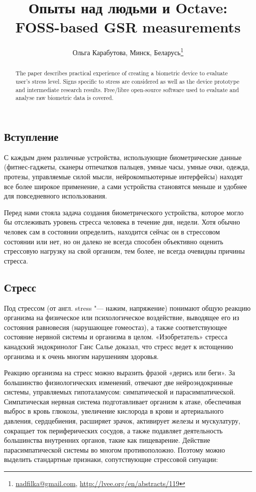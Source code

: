 \documentclass[10pt, a5paper]{article}
\begin{document}
\title{Опыты над людьми и Octave: FOSS-based GSR measurements}
\author{Ольга Карабутова, Минск, Беларусь\footnote{\url{nadfilka@gmail.com}, \url{http://lvee.org/en/abstracts/119}}}
\maketitle
\begin{abstract}
The paper describes practical experience of creating a biometric device to evaluate user’s stress level. Signs specific to stress are considered as well as the device prototype and intermediate research results. Free/libre open-source software used to evaluate and analyse raw biometric data is covered.
\end{abstract}
\subsection*{Вступление}

С каждым днем различные устройства, использующие биометрические данные (фитнес-гаджеты, сканеры отпечатков пальцев, умные часы, умные очки, одежда, протезы, управляемые силой мысли, нейрокомпьютерные интерфейсы) находят все более широкое применение, а сами устройства становятся меньше и удобнее для повседневного использования.

Перед нами стояла задача  создания биометрического устройства, которое могло бы отслеживать уровень стресса  человека в течение дня, недели.  Хотя обычно человек сам в состоянии определить, находится сейчас он в стрессовом состоянии или нет, но он далеко не всегда способен объективно оценить стрессовую  нагрузку на свой организм, тем более, не всегда очевидны причины стресса.

\subsection*{Стресс}

Под стрессом (от англ. stress "--- нажим, напряжение) понимают общую реакцию организма на физическое или психологическое воздействие, выводящее его из состояния равновесия (нарушающее гомеостаз), а также соответствующее состояние нервной системы и организма в целом.
«Изобретатель» стресса канадский эндокринолог Ганс Салье доказал, что стресс ведет к истощению организма и к очень многим нарушениям здоровья.

Реакцию организма на стресс можно выразить фразой «дерись или беги». За большинство физиологических изменений, отвечают две нейроэндокринные системы, управляемых гипоталамусом: симпатической и парасимпатической. Симпатическая нервная система подготавливает организм к атаке, обеспечивая выброс в кровь глюкозы, увеличение кислорода в крови и артериального давления, сердцебиения, расширяет зрачок, активирует железы и мускулатуру, сокращает ток периферических сосудов, а также подавляет деятельность большинства внутренних органов, такие как пищеварение. Действие парасимпатической системы во многом противоположно. Поэтому можно выделить стандартные признаки, сопутствующие стрессовой ситуации:
\end{document}

